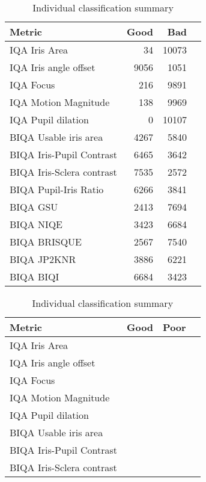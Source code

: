 
\begin{table}[h]
\begin{minipage}{0.48\linewidth}
	\centering
	\begin{tabular}{l  r r r}
		\bf{Metric} 								& \bf{Good} & \bf{Bad} \\\hline
		 IQA  Iris Area							& 34   & 	 10073\\
		 IQA  Iris angle offset			& 9056 & 		1051\\
		 IQA  Focus									& 216  &  	9891\\
		 IQA  Motion Magnitude 			& 138  & 		9969\\
		 IQA  Pupil dilation				& 0    & 	 10107\\
		 BIQA  Usable iris area			& 4267 & 		5840\\
		 BIQA Iris-Pupil Contrast		& 6465 & 		3642\\
		 BIQA Iris-Sclera contrast	& 7535 & 		2572\\
		 BIQA Pupil-Iris Ratio			& 6266 & 		3841\\
		 BIQA GSU										& 2413 & 		7694\\
		 BIQA NIQE									& 3423 & 		6684\\
		 BIQA BRISQUE								& 2567 & 		7540\\
		 BIQA JP2KNR								& 3886 & 		6221\\
		 BIQA BIQI									& 6684 & 		3423\\\hline
	\end{tabular}
	\caption{Individual classification summary}
	\label{tab:indclas}
\end{minipage}
\hfill
\begin{minipage}{0.48\linewidth}
	\centering
	\begin{tabular}{l  r r r}
		\bf{Metric} 								& \bf{Good} 	& \bf{Poor} 			\\\hline
		 IQA  Iris Area							&  						&	\checkmark   	\\
		 IQA  Iris angle offset			&  						& \checkmark 		\\
		 IQA  Focus									&   					& \checkmark   	\\
		 IQA  Motion Magnitude 			&   					& \checkmark  	\\
		 IQA  Pupil dilation				&    					& \checkmark  	\\
		 BIQA  Usable iris area			&  						& \checkmark 		\\
		 BIQA Iris-Pupil Contrast		& \checkmark  & 		\\
		 BIQA Iris-Sclera contrast	& \checkmark  & 		\\

\end{tabular}
\end{minipage}
\end{table}
